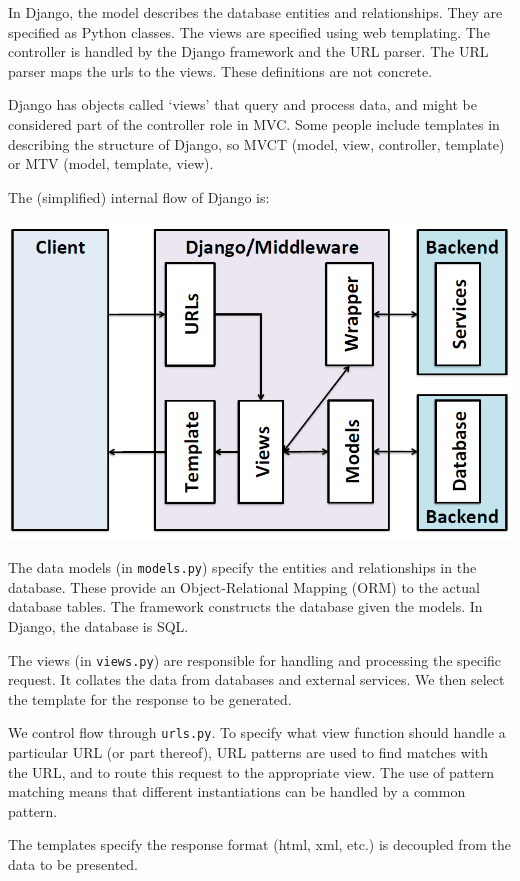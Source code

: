 \documentclass[a4paper, openany]{memoir}
\begin{document}
    In Django, the model describes the database entities and relationships. They are specified as Python classes. The views are specified using web templating. The controller is handled by the Django framework and the URL parser. The URL parser maps the urls to the views. These definitions are not concrete. 

    Django has objects called `views' that query and process data, and might be considered part of the controller role in MVC. Some people include templates in describing the structure of Django, so MVCT (model, view, controller, template) or MTV (model, template, view).

    The (simplified) internal flow of Django is:
    \begin{center}
        \includegraphics[scale=0.6]{src/L3I1.PNG}
    \end{center}
    The data models (in \texttt{models.py}) specify the entities and relationships in the database. These provide an Object-Relational Mapping (ORM) to the actual database tables. The framework constructs the database given the models. In Django, the database is SQL.

    The views (in \texttt{views.py}) are responsible for handling and processing the specific request. It collates the data from databases and external services. We then select the template for the response to be generated.

    We control flow through \texttt{urls.py}. To specify what view function should handle a particular URL (or part thereof), URL patterns are used to find matches with the URL, and to route this request to the appropriate view. The use of pattern matching means that different instantiations can be handled by a common pattern.

    The templates specify the response format (html, xml, etc.) is decoupled from the data to be presented.
\end{document}

